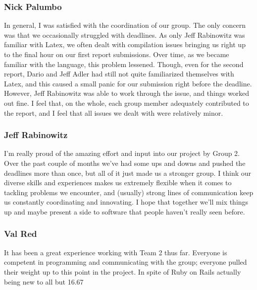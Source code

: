 \subsubsection{Nick Palumbo}
In general, I was satisfied with the coordination of our group. The only concern was that we occasionally struggled with deadlines. As only Jeff Rabinowitz was familiar with Latex, we often dealt with compilation issues bringing us right up to the final hour on our first report submissions. Over time, as we became familiar with the language, this problem lessened. Though, even for the second report, Dario and Jeff Adler had still not quite familiarized themselves with Latex, and this caused a small panic for our submission right before the deadline. However, Jeff Rabinowitz was able to work through the issue, and things worked out fine. I feel that, on the whole, each group member adequately contributed to the report, and I feel that all issues we dealt with were relatively minor.\\

\subsubsection{Jeff Rabinowitz}
I'm really proud of the amazing effort and input into our project by Group 2. Over the past couple of months we've had some ups and downs and pushed the deadlines more than once, but all of it just made us a stronger group. I think our diverse skills and experiences makes us extremely flexible when it comes to tackling problems we encounter, and (usually) strong lines of communication keep us constantly coordinating and innovating. I hope that together we'll mix things up and maybe present a side to software that people haven't really seen before. \\

\subsubsection{Val Red}
It has been a great experience working with Team 2 thus far. Everyone is competent in programming and communicating with the group; everyone pulled their weight up to this point in the project. In spite of Ruby on Rails actually being new to all but 16.67%

